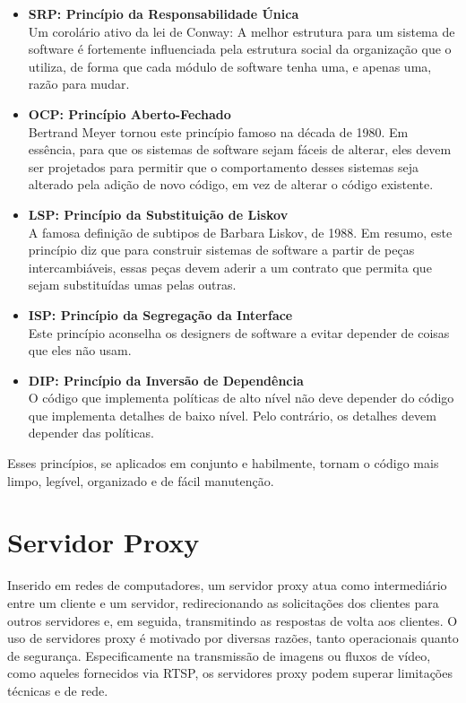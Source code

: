 \documentclass[12pt, %
openright, 
oneside, %
a4paper,    %
brazil]{facom-ufu-abntex2}
\begin{document}
\begin{itemize}
	\item \textbf{SRP: Princípio da Responsabilidade Única}\\
	      Um corolário ativo da lei de Conway: A melhor estrutura para um
	      sistema de software é fortemente influenciada pela estrutura social da
	      organização que o utiliza, de forma que cada módulo de software tenha uma, e
	      apenas uma, razão para mudar.

	\item \textbf{OCP: Princípio Aberto-Fechado}\\
	      Bertrand Meyer tornou este princípio famoso na década de 1980. Em
	      essência, para que os sistemas de software sejam fáceis de alterar, eles devem
	      ser projetados para permitir que o comportamento desses sistemas seja alterado
	      pela adição de novo código, em vez de alterar o código existente.

	\item \textbf{LSP: Princípio da Substituição de Liskov}\\
	      A famosa definição de subtipos de Barbara Liskov, de 1988. Em
	      resumo, este princípio diz que para construir sistemas de software a partir de
	      peças intercambiáveis, essas peças devem aderir a um contrato que permita que
	      sejam substituídas umas pelas outras.

	\item \textbf{ISP: Princípio da Segregação da Interface}\\
	      Este princípio aconselha os designers de software a evitar
	      depender de coisas que eles não usam.

	\item \textbf{DIP: Princípio da Inversão de Dependência}\\
	      O código que implementa políticas de alto nível não deve depender
	      do código que implementa detalhes de baixo nível. Pelo contrário, os detalhes
	      devem depender das políticas.
\end{itemize}

Esses princípios, se aplicados em conjunto e habilmente, tornam o código mais
limpo, legível, organizado e de fácil manutenção.

\section{Servidor Proxy}

Inserido em redes de computadores, um servidor proxy atua como intermediário
entre um cliente e um servidor, redirecionando as solicitações dos clientes
para outros servidores e, em seguida, transmitindo as respostas de volta aos
clientes. O uso de servidores proxy é motivado por diversas razões, tanto
operacionais quanto de segurança. Especificamente na transmissão de imagens ou
fluxos de vídeo, como aqueles fornecidos via RTSP, os servidores proxy podem
superar limitações técnicas e de rede.
\end{document}
